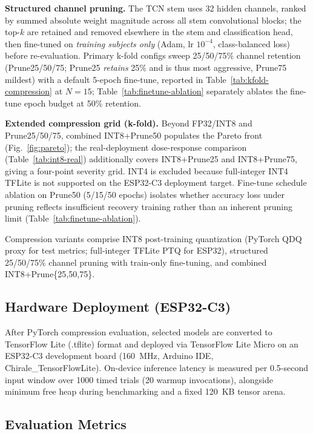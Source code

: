 \documentclass[conference]{IEEEtran}
\begin{document}
\textbf{Structured channel pruning.} The TCN stem uses 32 hidden channels, ranked by summed
absolute weight magnitude across all stem convolutional blocks; the top-$k$ are retained and
removed elsewhere in the stem and classification head, then fine-tuned on \emph{training subjects
only} (Adam, lr $10^{-4}$, class-balanced loss) before re-evaluation. Primary k-fold configs sweep
25/50/75\% channel retention (Prune25/50/75; Prune25 \emph{retains} 25\% and is thus most
aggressive, Prune75 mildest) with a default 5-epoch fine-tune, reported in
Table~\ref{tab:kfold-compression} at $N{=}15$; Table~\ref{tab:finetune-ablation} separately ablates
the fine-tune epoch budget at 50\% retention.

\textbf{Extended compression grid (k-fold).} Beyond FP32/INT8 and Prune25/50/75, combined
INT8+Prune50 populates the Pareto front (Fig.~\ref{fig:pareto}); the real-deployment dose-response
comparison (Table~\ref{tab:int8-real}) additionally covers INT8+Prune25 and INT8+Prune75, giving a
four-point severity grid. INT4 is excluded because full-integer INT4 TFLite is not supported on the
ESP32-C3 deployment target. Fine-tune schedule ablation on Prune50 (5/15/50 epochs) isolates
whether accuracy loss under pruning reflects insufficient recovery training rather than an inherent
pruning limit (Table~\ref{tab:finetune-ablation}).

Compression variants comprise INT8 post-training quantization (PyTorch QDQ proxy for test metrics;
full-integer TFLite PTQ for ESP32), structured 25/50/75\% channel pruning with train-only
fine-tuning, and combined INT8+Prune\{25,50,75\}.

\subsection{Hardware Deployment (ESP32-C3)}

After PyTorch compression evaluation, selected models are converted to TensorFlow Lite (.tflite)
format and deployed via TensorFlow Lite Micro on an ESP32-C3 development board (160~MHz, Arduino
IDE, Chirale\_TensorFlowLite). On-device inference latency is measured per 0.5-second input window
over 1000 timed trials (20 warmup invocations), alongside minimum free heap during benchmarking and
a fixed 120~KB tensor arena.

\subsection{Evaluation Metrics}
\end{document}
